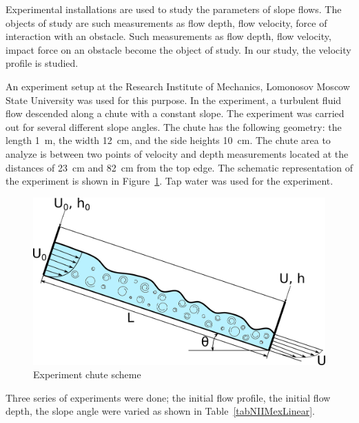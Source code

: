 \documentclass[applsci,article,submit,moreauthors,pdftex]{Definitions/mdpi}
\begin{document}
Experimental installations are used to study the parameters of slope flows. The objects of study are such measurements as flow depth, flow velocity, force of interaction with an obstacle. Such measurements as flow depth, flow velocity, impact force on an obstacle become the object of study. In our study, the velocity profile is studied.

An experiment setup at the Research Institute of Mechanics, Lomonosov Moscow State University \cite{fluids7030111} was used for this purpose. In the experiment, a turbulent fluid flow descended along a chute with a constant slope. The experiment was carried out for several different slope angles. The chute has the following geometry: the length 1~m, the width 12~cm, and the side heights 10~cm. The chute area to analyze is between two points of velocity and depth measurements located at the distances of 23~cm and 82~cm from the top edge. The schematic representation of the experiment is shown in Figure~\ref{NIIMexLinearUProfileInlet}. Tap water was used for the experiment.

\begin{figure}[H]	
\widefigure
\includegraphics[width=10 cm]{NIIMexLinearUProfileInlet.png}
\caption{Experiment chute scheme\label{NIIMexLinearUProfileInlet}}
\end{figure}

Three series of experiments were done; the initial flow profile, the initial flow depth, the slope angle were varied as shown in Table~\ref{tabNIIMexLinear}.

\end{document}
